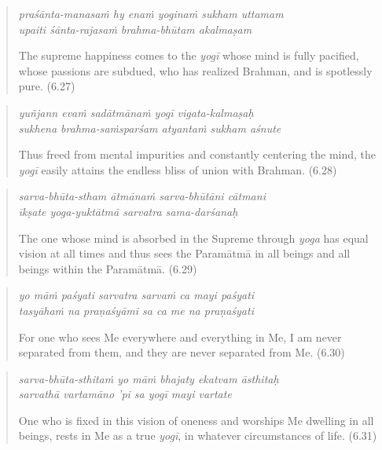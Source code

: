 \documentclass[12pt, twoside, openright]{memoir}
\begin{document}
\par
\begin{verse}
\textit{praśānta-manasaṁ hy enaṁ yoginaṁ sukham uttamam} \\
\textit{upaiti śānta-rajasaṁ brahma-bhūtam akalmaṣam}

\noindent The supreme happiness comes to the \textit{yogī} whose mind is fully pacified, whose passions are subdued, who has realized Brahman, and is spotlessly pure. (6.27)
\end{verse}
\par



\par
\begin{verse}
\textit{yuñjann evaṁ sadātmānaṁ yogī vigata-kalmaṣaḥ} \\
\textit{sukhena brahma-saṁsparśam atyantaṁ sukham aśnute}

\noindent Thus freed from mental impurities and constantly centering the mind, the \textit{yogī} easily attains the endless bliss of union with Brahman. (6.28)
\end{verse}
\par



\par
\begin{verse}
\textit{sarva-bhūta-stham ātmānaṁ sarva-bhūtāni cātmani} \\
\textit{īkṣate yoga-yuktātmā sarvatra sama-darśanaḥ}

\noindent The one whose mind is absorbed in the Supreme through \textit{yoga} has equal vision at all times and thus sees the Paramātmā in all beings and all beings within the Paramātmā. (6.29)
\end{verse}
\par



\par
\begin{verse}
\textit{yo māṁ paśyati sarvatra sarvaṁ ca mayi paśyati} \\
\textit{tasyāhaṁ na praṇaśyāmi sa ca me na praṇaśyati}

\noindent For one who sees Me everywhere and everything in Me, I am never separated from them, and they are never separated from Me. (6.30)
\end{verse}
\par



\par
\begin{verse}
\textit{sarva-bhūta-sthitaṁ yo māṁ bhajaty ekatvam āsthitaḥ} \\
\textit{sarvathā vartamāno ’pi sa yogī mayi vartate}

\noindent One who is fixed in this vision of oneness and worships Me dwelling in all beings, rests in Me as a true \textit{yogī}, in whatever circumstances of life. (6.31)
\end{verse}
\par
\end{document}
